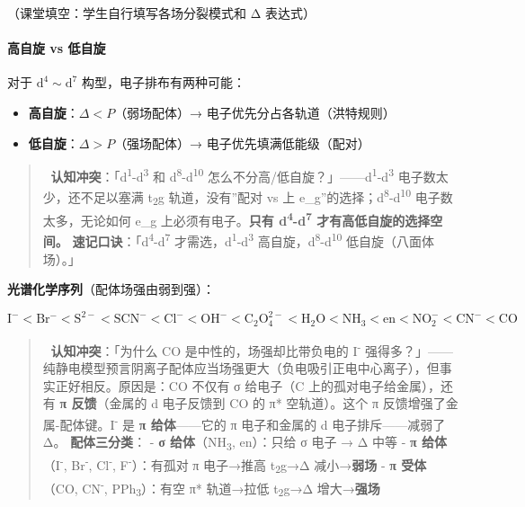 \documentclass[a4paper,11pt]{ctexart}
\providecommand{\tightlist}{\setlength{\itemsep}{0pt}\setlength{\parskip}{0pt}}
\begin{document}
（课堂填空：学生自行填写各场分裂模式和 Δ 表达式）

\paragraph{高自旋 vs 低自旋}\label{ux9ad8ux81eaux65cb-vs-ux4f4eux81eaux65cb}

对于 \(\mathrm{d^4 \sim d^7}\) 构型，电子排布有两种可能：

\begin{itemize}
\tightlist
\item
  \textbf{高自旋}：\(\Delta < P\)（弱场配体）→ 电子优先分占各轨道（洪特规则）
\item
  \textbf{低自旋}：\(\Delta > P\)（强场配体）→ 电子优先填满低能级（配对）
\end{itemize}

\begin{quote}
🧠 \textbf{认知冲突}：「d\textsuperscript{1}-d\textsuperscript{3} 和 d\textsuperscript{8}-d\textsuperscript{10} 怎么不分高/低自旋？」------d\textsuperscript{1}-d\textsuperscript{3} 电子数太少，还不足以塞满 t\textsubscript{2}g 轨道，没有''配对 vs 上 e\_g''的选择；d\textsuperscript{8}-d\textsuperscript{10} 电子数太多，无论如何 e\_g 上必须有电子。\textbf{只有 d\textsuperscript{4}-d\textsuperscript{7} 才有高低自旋的选择空间。}
\textbf{速记口诀}：「d\textsuperscript{4}-d\textsuperscript{7} 才需选，d\textsuperscript{1}-d\textsuperscript{3} 高自旋，d\textsuperscript{8}-d\textsuperscript{10} 低自旋（八面体场）。」
\end{quote}

\textbf{光谱化学序列}（配体场强由弱到强）：

\[
\mathrm{I^- < Br^- < S^{2-} < SCN^- < Cl^- < OH^- < C_2O_4^{2-} < H_2O < NH_3 < en < NO_2^- < CN^- < CO}
\]

\begin{quote}
🧠 \textbf{认知冲突}：「为什么 CO 是中性的，场强却比带负电的 I\textsuperscript{-} 强得多？」------纯静电模型预言阴离子配体应当场强更大（负电吸引正电中心离子），但事实正好相反。原因是：CO 不仅有 σ 给电子（C 上的孤对电子给金属），还有 \textbf{π 反馈}（金属的 d 电子反馈到 CO 的 π* 空轨道）。这个 π 反馈增强了金属-配体键。I\textsuperscript{-} 是 \textbf{π 给体}------它的 π 电子和金属的 d 电子排斥------减弱了 Δ。
\textbf{配体三分类}：
- \textbf{σ 给体}（NH\textsubscript{3}, en）：只给 σ 电子 → Δ 中等
- \textbf{π 给体}（I\textsuperscript{-}, Br\textsuperscript{-}, Cl\textsuperscript{-}, F\textsuperscript{-}）：有孤对 π 电子→推高 t\textsubscript{2}g→Δ 减小→\textbf{弱场}
- \textbf{π 受体}（CO, CN\textsuperscript{-}, PPh\textsubscript{3}）：有空 π* 轨道→拉低 t\textsubscript{2}g→Δ 增大→\textbf{强场}
\end{quote}
\end{document}
